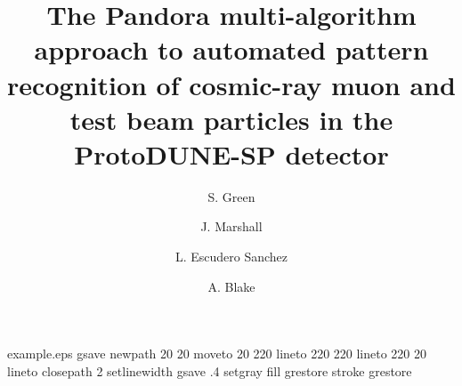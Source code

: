 
%
%
%
%
%
\begin{filecontents*}{example.eps}
gsave
newpath
  20 20 moveto
  20 220 lineto
  220 220 lineto
  220 20 lineto
closepath
2 setlinewidth
gsave
  .4 setgray fill
grestore
stroke
grestore
\end{filecontents*}
%
\RequirePackage{fix-cm}
%
\documentclass{svjour3}                     %
%
\smartqed  %
%
\usepackage{graphicx}
\usepackage{caption}    
\usepackage{subfig} 
%
%
%
%
%


\title{The Pandora multi-algorithm approach to automated pattern recognition of cosmic-ray muon and test beam particles in the ProtoDUNE-SP detector
}

\author{S. Green \and
        J. Marshall \and 
        L. Escudero Sanchez \and 
        A. Blake
}



